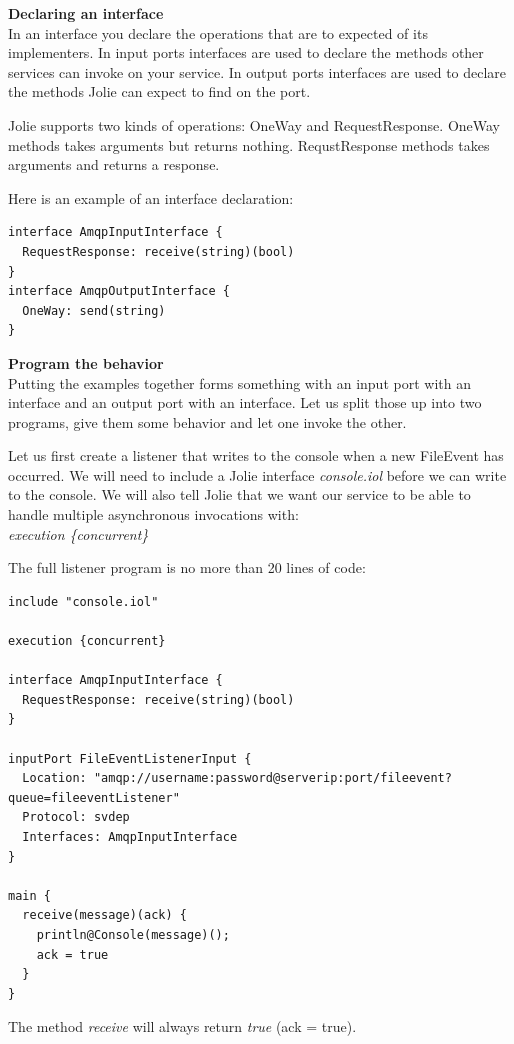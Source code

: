 \noindent\textbf{Declaring an interface}\\
In an interface you declare the operations that are to expected of its implementers. In input ports interfaces are used to declare the methods other services can invoke on your service. In output ports interfaces are used to declare the methods Jolie can expect to find on the port.

Jolie supports two kinds of operations: OneWay and RequestResponse. OneWay methods takes arguments but returns nothing. RequstResponse methods takes arguments and returns a response.

Here is an example of an interface declaration:

\begin{lstlisting}
interface AmqpInputInterface {
  RequestResponse: receive(string)(bool)
}
interface AmqpOutputInterface {
  OneWay: send(string)
}
\end{lstlisting}

\noindent\textbf{Program the behavior}\\
Putting the examples together forms something with an input port with an interface and an output port with an interface. Let us split those up into two programs, give them some behavior and let one invoke the other.

Let us first create a listener that writes to the console when a new FileEvent has occurred. We will need to include a Jolie interface \textit{console.iol} before we can write to the console. We will also tell Jolie that we want our service to be able to handle multiple asynchronous invocations with:\\
\indent\textit{execution \{concurrent\}}

The full listener program is no more than 20 lines of code:

\begin{lstlisting}
include "console.iol"

execution {concurrent}

interface AmqpInputInterface {
  RequestResponse: receive(string)(bool)
}

inputPort FileEventListenerInput {
  Location: "amqp://username:password@serverip:port/fileevent?queue=fileeventListener"
  Protocol: svdep
  Interfaces: AmqpInputInterface
}

main {
  receive(message)(ack) {
    println@Console(message)();
    ack = true
  }
}
\end{lstlisting}

The method \textit{receive} will always return \textit{true} (ack = true).

